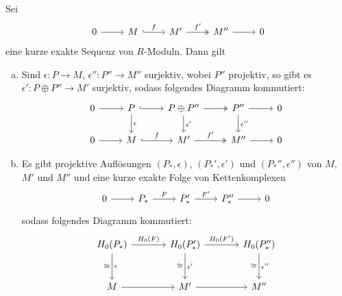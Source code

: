 \begin{lemma}[{name=[{projektive Auflösungen von kurzen exakten Folgen}]},label=lem:proj_aufl_kes_ketten]
	Sei 
	\[
		\begin{tikzcd}
			0 \rar & M \rar["f",hook] & M' \rar["f'",two heads] & M'' \rar & 0
		\end{tikzcd}
	\]
	eine kurze exakte Sequenz von $R$-Moduln. Dann gilt
	\begin{enumerate}[a)]
		\item Sind $\epsilon \colon P \to M$, $\epsilon'' \colon P'' \to M''$ surjektiv, wobei $P''$ projektiv, so gibt es $\epsilon' \colon P \oplus P'' \to M'$ surjektiv, sodass folgendes Diagramm kommutiert:
		\[
			\begin{tikzcd}
				0 \rar & P \rar[hook] \dar["\epsilon"] & P \oplus P'' \rar[two heads] \dar["\epsilon'"] & P'' \rar  \dar["\epsilon''"] & 0 \\
				0 \rar & M \rar["f",hook] & M' \rar["f'", two heads] & M'' \rar & 0
			\end{tikzcd}
		\]
		\item Es gibt projektive Auflösungen $(P_*,\epsilon)$, $(P_*',\epsilon')$ und $(P_*'',\epsilon'')$ von $M$, $M'$ und $M''$ und eine kurze exakte Folge von Kettenkomplexen
		\[
			\begin{tikzcd}
				0 \rar & P_* \rar["F"] & P_*' \rar["F'"] & P_*'' \rar & 0
			\end{tikzcd}
		\]
		sodass folgendes Diagramm kommutiert:
		\[
			\begin{tikzcd}[sep=large]
				H_0(P_*) \rar["H_0(F)"] \dar["\epsilon","\cong"'] & H_0(P_*') \dar["\epsilon'","\cong"'] \rar["H_0(F')"] & H_0(P_*'') \dar["\epsilon''","\cong"'] \\
				M \rar & M' \rar & M''
			\end{tikzcd}
		\]
	\end{enumerate}
\end{lemma}
